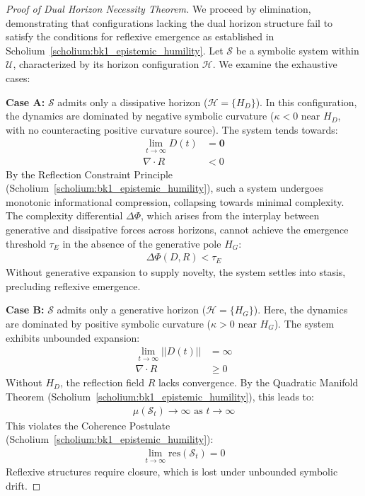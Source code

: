 \begin{proof}[Proof of Dual Horizon Necessity Theorem]
\label{proof:bk1_proof_of_dual_horizon_necessity_theorem}
We proceed by elimination, demonstrating that configurations lacking the dual horizon structure fail to satisfy the conditions for reflexive emergence as established in Scholium~\ref{scholium:bk1_epistemic_humility}. Let $\mathcal{S}$ be a symbolic system within $\mathcal{U}$, characterized by its horizon configuration $\mathcal{H}$. We examine the exhaustive cases:

\textbf{Case A:} $\mathcal{S}$ admits only a dissipative horizon ($\mathcal{H} = \{H_D\}$).  
In this configuration, the dynamics are dominated by negative symbolic curvature ($\kappa < 0$ near $H_D$, with no counteracting positive curvature source). The system tends towards:
\begin{align}
\lim_{t \to \infty} D(t) &= \mathbf{0} \\
\nabla \cdot R &< 0
\end{align}
By the Reflection Constraint Principle (Scholium~\ref{scholium:bk1_epistemic_humility}), such a system undergoes monotonic informational compression, collapsing towards minimal complexity. The complexity differential $\Delta\Phi$, which arises from the interplay between generative and dissipative forces across horizons, cannot achieve the emergence threshold $\tau_E$ in the absence of the generative pole $H_G$:
\begin{align}
\Delta\Phi(D, R) < \tau_E
\end{align}
Without generative expansion to supply novelty, the system settles into stasis, precluding reflexive emergence.

\textbf{Case B:} $\mathcal{S}$ admits only a generative horizon ($\mathcal{H} = \{H_G\}$).  
Here, the dynamics are dominated by positive symbolic curvature ($\kappa > 0$ near $H_G$). The system exhibits unbounded expansion:
\begin{align}
\lim_{t \to \infty} ||D(t)|| &= \infty \\
\nabla \cdot R &\ge 0
\end{align}
Without $H_D$, the reflection field $R$ lacks convergence. By the Quadratic Manifold Theorem (Scholium~\ref{scholium:bk1_epistemic_humility}), this leads to:
\begin{align}
\mu(\mathcal{S}_t) \to \infty \text{ as } t \to \infty
\end{align}
This violates the Coherence Postulate (Scholium~\ref{scholium:bk1_epistemic_humility}):
\begin{align}
\lim_{t \to \infty} \text{res}(\mathcal{S}_t) = 0
\end{align}
Reflexive structures require closure, which is lost under unbounded symbolic drift.


\end{proof}
